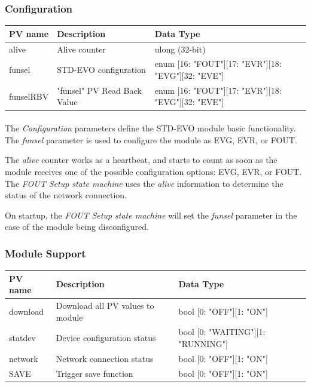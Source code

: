 \documentclass[openany]{article}
\begin{document}
		\subsubsection{Configuration}\label{pvgroup:fout-configuration}
			\begin{center}
			\begin{tabular}{| m{2.8cm} m{6cm} m{6cm} |}
			    \hline
			    \bfseries PV name & \bfseries Description & \bfseries Data Type \\ \hline
			    alive & Alive counter & ulong (32-bit) \\ \hline
			    funsel & STD-EVO configuration & enum [16: "FOUT"][17: "EVR"][18: "EVG"][32: "EVE"] \\ \hline
			    funselRBV & "funsel" PV Read Back Value & enum [16: "FOUT"][17: "EVR"][18: "EVG"][32: "EVE"] \\ \hline
			\end{tabular}
			\end{center}

			\paragraph{} The \emph{Configuration} parameters define the STD-EVO module basic functionality. The \emph{funsel} parameter is used to configure the module as EVG, EVR, or FOUT. 
			\par The \emph{alive} counter works as a heartbeat, and starts to count as soon as the module receives one of the possible configuration options: EVG, EVR, or FOUT. The \emph{FOUT Setup state machine} uses the \emph{alive} information to determine the status of the network connection.
			\par On startup, the \emph{FOUT Setup state machine} will set the \emph{funsel} parameter in the case of the module being disconfigured.

		\subsubsection{Module Support}\label{pvgroup:fout-module-support}
			\begin{center}
			\begin{tabular}{| m{2.8cm} m{6cm} m{6cm} |}
			    \hline
			    \bfseries PV name & \bfseries Description & \bfseries Data Type \\ \hline
			    download & Download all PV values to module & bool [0: "OFF"][1: "ON"] \\ \hline
			    statdev & Device configuration status & bool [0: "WAITING"][1: "RUNNING"] \\ \hline
			    network & Network connection status & bool [0: "OFF"][1: "ON"] \\ \hline
			    SAVE & Trigger save function & bool [0: "OFF"][1: "ON"] \\ \hline
			\end{tabular}
			\end{center}
\end{document}
